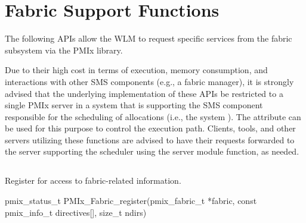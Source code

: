 

\section{Fabric Support Functions}

The following \acp{API} allow the \ac{WLM} to request specific services from the fabric subsystem via the \ac{PMIx} library.

\advicermstart
Due to their high cost in terms of execution, memory consumption, and interactions with other \ac{SMS} components (e.g., a fabric manager), it is strongly advised that the underlying implementation of these \acp{API} be restricted to a single \ac{PMIx} server in a system that is supporting the \ac{SMS} component responsible for the scheduling of allocations (i.e., the system ). The  attribute can be used for this purpose to control the execution path. Clients, tools, and other servers utilizing these functions are advised to have their requests forwarded to the server supporting the scheduler using the  server module function, as needed.
\advicermend

\subsection{}

\summary

Register for access to fabric-related information.

\format

\cspecificstart
\begin{codepar}
pmix_status_t
PMIx_Fabric_register(pmix_fabric_t *fabric,
                     const pmix_info_t directives[],
                     size_t ndirs)
\end{codepar}
\cspecificend

